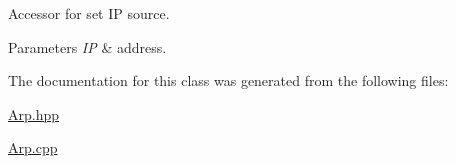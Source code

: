 Accessor for set I\-P source. 


\begin{DoxyParams}{Parameters}
{\em I\-P} & address. \\
\hline
\end{DoxyParams}


The documentation for this class was generated from the following files\-:\begin{DoxyCompactItemize}
\item 
\hyperlink{_arp_8hpp}{Arp.\-hpp}\item 
\hyperlink{_arp_8cpp}{Arp.\-cpp}\end{DoxyCompactItemize}
